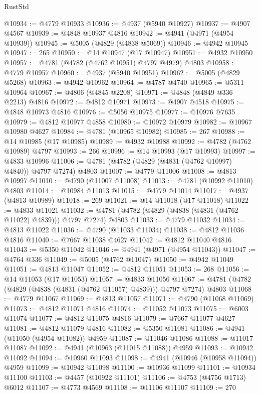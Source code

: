 \begin{lexlean}{RustStd}
\begin{coremodule}
@10934 := @4779 @10933
@10936 := @4937 (@5940 @10927)
@10937 := @4907 @4567
@10939 := @4848 @10937 @4816
@10942 := @4941 (@4971 (@4954 @10939))
@10945 := @5005 (@4829 (@4838 @5069))
@10946 := @4942 @10945
@10947 := 265
@10950 := @14 @10947 (@17 @10947)
@10951 := @4932 @10950
@10957 := @4781 (@4782 (@4762 @10951) @4797 @4979) @4803
@10958 := @4779 @10957
@10960 := @4937 (@5940 @10951)
@10962 := @5005 (@4829 @5268)
@10963 := @4942 @10962
@10964 := @4787 @4740
@10965 := @5311 @10964
@10967 := @4806 (@4845 @2208)
@10971 := @4848 (@4849 @336 @2213) @4816
@10972 := @4812 @10971
@10973 := @4907 @4518
@10975 := @4848 @10973 @4816
@10976 := @5056 @10975
@10977 := @10976 @7635
@10979 := @4812 @10977 @4858
@10980 := @10972 @10979
@10982 := @10967 @10980 @4627
@10984 := @4781 (@10965 @10982)
@10985 := 267
@10988 := @14 @10985 (@17 @10985)
@10989 := @4932 @10988
@10992 := @4782 (@4762 @10989) @4797
@10993 := 266
@10996 := @14 @10993 (@17 @10993)
@10997 := @4833 @10996
@11006 := @4781 (@4782 (@4829 (@4831 (@4762 @10997) @4840)) @4797 @7274) @4803
@11007 := @4779 @11006
@11008 := @4813 @10997
@11010 := @4790 (@11007 @11008)
@11013 := @4781 (@10992 @11010) @4803
@11014 := @10984 @11013
@11015 := @4779 @11014
@11017 := @4937 (@4813 @10989)
@11018 := 269
@11021 := @14 @11018 (@17 @11018)
@11022 := @4833 @11021
@11032 := @4781 (@4782 (@4829 (@4838 (@4831 (@4762 @11022) @4839))) @4797 @7274) @4803
@11033 := @4779 @11032
@11034 := @4813 @11022
@11036 := @4790 (@11033 @11034)
@11038 := @4812 @11036 @4816
@11040 := @7667 @11038 @4627
@11042 := @4812 @11040 @4816
@11043 := @5350 @11042
@11046 := @4941 (@4971 (@4954 @11043))
@11047 := @4764 @336
@11049 := @5005 (@4762 @11047)
@11050 := @4942 @11049
@11051 := @4813 @11047
@11052 := @4812 @11051
@11053 := 268
@11056 := @14 @11053 (@17 @11053)
@11057 := @4833 @11056
@11067 := @4781 (@4782 (@4829 (@4838 (@4831 (@4762 @11057) @4839))) @4797 @7274) @4803
@11068 := @4779 @11067
@11069 := @4813 @11057
@11071 := @4790 (@11068 @11069)
@11073 := @4812 @11071 @4816
@11074 := @11052 @11073
@11075 := @6003 @11074
@11077 := @4812 @11075 @4816
@11079 := @7667 @11077 @4627
@11081 := @4812 @11079 @4816
@11082 := @5350 @11081
@11086 := @4941 (@11050 (@4954 @11082)) @4959
@11087 := @11046 @11086
@11088 := @11017 @11087
@11092 := @4941 (@10963 (@11015 @11088)) @4959
@11093 := @10942 @11092
@11094 := @10960 @11093
@11098 := @4941 (@10946 (@10958 @11094)) @4959
@11099 := @10942 @11098
@11100 := @10936 @11099
@11101 := @10934 @11100
@11103 := @4457 (@10922 @11101)
@11106 := @4753 (@4756 @1713) @6012
@11107 := @4773 @4569
@11108 := @11106 @11107
@11109 := 270

\end{coremodule}
\end{lexlean}
